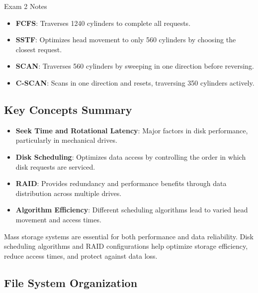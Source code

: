 \begin{examnotes}{Exam 2 Notes}
    \begin{highlight}
        \begin{itemize}
            \item \textbf{FCFS}: Traverses 1240 cylinders to complete all requests.
            \item \textbf{SSTF}: Optimizes head movement to only 560 cylinders by choosing the closest request.
            \item \textbf{SCAN}: Traverses 560 cylinders by sweeping in one direction before reversing.
            \item \textbf{C-SCAN}: Scans in one direction and resets, traversing 350 cylinders actively.
        \end{itemize}
    \end{highlight}
    
    \subsection*{Key Concepts Summary}
    
    \begin{highlight}
        \begin{itemize}
            \item \textbf{Seek Time and Rotational Latency}: Major factors in disk performance, particularly in mechanical drives.
            \item \textbf{Disk Scheduling}: Optimizes data access by controlling the order in which disk requests are serviced.
            \item \textbf{RAID}: Provides redundancy and performance benefits through data distribution across multiple drives.
            \item \textbf{Algorithm Efficiency}: Different scheduling algorithms lead to varied head movement and access times.
        \end{itemize}
    \end{highlight}
    
    Mass storage systems are essential for both performance and data reliability. Disk scheduling algorithms and RAID configurations help optimize storage efficiency, reduce access times, and protect against data loss.

    \subsection*{File System Organization}


\end{examnotes}
